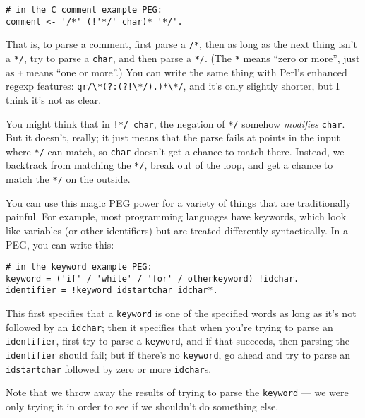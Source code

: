 \documentclass[
]{article}
\begin{document}
\begin{verbatim}
# in the C comment example PEG:
comment <- '/*' (!'*/' char)* '*/'.
\end{verbatim}

That is, to parse a comment, first parse a \texttt{/*}, then as long as
the next thing isn't a \texttt{*/}, try to parse a \texttt{char}, and
then parse a \texttt{*/}. (The \texttt{*} means ``zero or more'', just
as \texttt{+} means ``one or more''.) You can write the same thing with
Perl's enhanced regexp features:
\texttt{qr\textbar{}/\textbackslash{}*(?:(?!\textbackslash{}*/).)*\textbackslash{}*/\textbar{}},
and it's only slightly shorter, but I think it's not as clear.

You might think that in
\texttt{!\textquotesingle{}*/\textquotesingle{}\ char}, the negation of
\texttt{\textquotesingle{}*/\textquotesingle{}} somehow \emph{modifies}
\texttt{char}. But it doesn't, really; it just means that the parse
fails at points in the input where
\texttt{\textquotesingle{}*/\textquotesingle{}} can match, so
\texttt{char} doesn't get a chance to match there. Instead, we backtrack
from matching the \texttt{\textquotesingle{}*/\textquotesingle{}}, break
out of the loop, and get a chance to match the
\texttt{\textquotesingle{}*/\textquotesingle{}} on the outside.

You can use this magic PEG power for a variety of things that are
traditionally painful. For example, most programming languages have
keywords, which look like variables (or other identifiers) but are
treated differently syntactically. In a PEG, you can write this:

\begin{verbatim}
# in the keyword example PEG:
keyword = ('if' / 'while' / 'for' / otherkeyword) !idchar.
identifier = !keyword idstartchar idchar*.
\end{verbatim}

This first specifies that a \texttt{keyword} is one of the specified
words as long as it's not followed by an \texttt{idchar}; then it
specifies that when you're trying to parse an \texttt{identifier}, first
try to parse a \texttt{keyword}, and if that succeeds, then parsing the
\texttt{identifier} should fail; but if there's no \texttt{keyword}, go
ahead and try to parse an \texttt{idstartchar} followed by zero or more
\texttt{idchar}s.

Note that we throw away the results of trying to parse the
\texttt{keyword} --- we were only trying it in order to see if we
shouldn't do something else.
\end{document}
